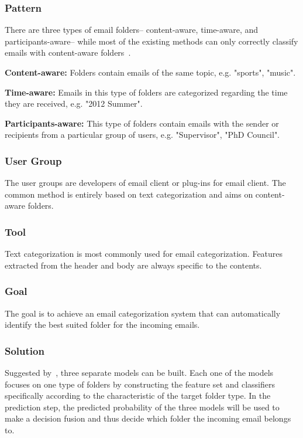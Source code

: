 \documentclass{sig-alternate-05-2015}
\begin{document}
\subsubsection{Pattern}

There are three types of email folders-- content-aware, time-aware, and participants-aware-- while most of the existing methods can only correctly classify emails with content-aware folders~\cite{dehghani2016alecsa}.

\textbf{Content-aware:} Folders contain emails of the same topic, e.g. "sports", "music".

\textbf{Time-aware:} Emails in this type of folders are categorized regarding the time they are received, e.g. "2012 Summer".

\textbf{Participants-aware:} This type of folders contain emails with the sender or recipients from a particular group of users, e.g. "Supervisor", "PhD Council".

\subsubsection{User Group}

The user groups are developers of email client or plug-ins for email client. The common method is entirely based on text categorization and aims on content-aware folders.

\subsubsection{Tool}

Text categorization is most commonly used for email categorization. Features extracted from the header and body are always specific to the contents.

\subsubsection{Goal}

The goal is to achieve an email categorization system that can automatically identify the best suited folder for the incoming emails.

\subsubsection{Solution}

Suggested by~\cite{dehghani2016alecsa}, three separate models can be built. Each one of the models focuses on one type of folders by constructing the feature set and classifiers specifically according to the characteristic of the target folder type. In the prediction step, the predicted probability of the three models will be used to make a decision fusion and thus decide which folder the incoming email belongs to.
\end{document}
